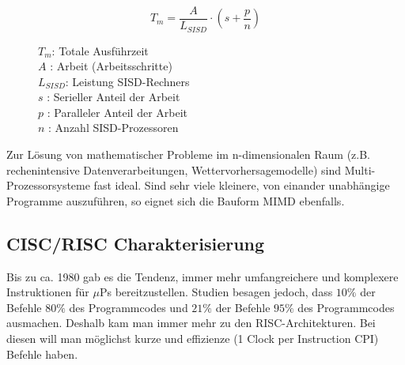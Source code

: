\begin{figure}[ht]
	\begin{minipage}[t]{0.475\textwidth}
		\begin{equation*}
			T_m = \dfrac{A}{L_{SISD}} \cdot \left( s + \dfrac{p}{n} \right)
		\end{equation*}
	\end{minipage}
	\hfill
	\begin{minipage}[t]{0.475\textwidth}
		$T_m$: Totale Ausführzeit\\
		$A$      : Arbeit (Arbeitsschritte)\\
		$L_{SISD}$: Leistung SISD-Rechners\\
		$s$      : Serieller Anteil der Arbeit\\
		$p$      : Paralleler Anteil der Arbeit\\
		$n$      : Anzahl SISD-Prozessoren
	\end{minipage}	
\end{figure}

Zur Lösung von mathematischer Probleme im n-dimensionalen Raum (z.B. rechenintensive Datenverarbeitungen, Wettervorhersagemodelle) sind Multi-Prozessorsysteme fast ideal.
Sind sehr viele kleinere, von einander unabhängige Programme auszuführen, so eignet sich die Bauform MIMD ebenfalls.

\subsection{CISC/RISC Charakterisierung}

Bis zu ca. 1980 gab es die Tendenz, immer mehr umfangreichere und komplexere Instruktionen für $\mu$Ps bereitzustellen.
Studien besagen jedoch, dass $10\%$ der Befehle $80\%$ des Programmcodes und $21\%$ der Befehle $95\%$ des Programmcodes ausmachen.
Deshalb kam man immer mehr zu den RISC-Architekturen.
Bei diesen will man möglichst kurze und effizienze (1 Clock per Instruction CPI) Befehle haben.

